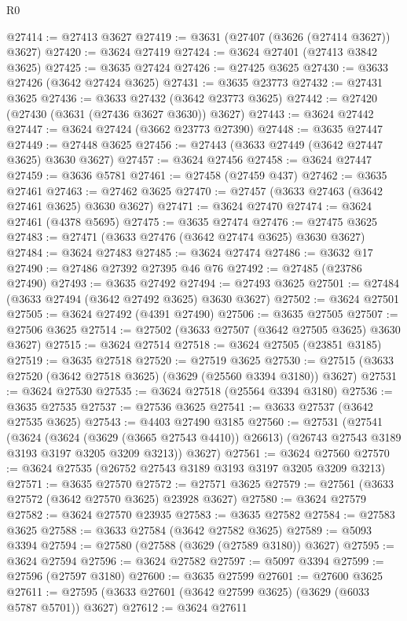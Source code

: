 \begin{lexlean}{R0}
\begin{coremodule}
@27414 := @27413 @3627
@27419 := @3631 (@27407 (@3626 (@27414 @3627)) @3627)
@27420 := @3624 @27419
@27424 := @3624 @27401 (@27413 @3842 @3625)
@27425 := @3635 @27424
@27426 := @27425 @3625
@27430 := @3633 @27426 (@3642 @27424 @3625)
@27431 := @3635 @23773
@27432 := @27431 @3625
@27436 := @3633 @27432 (@3642 @23773 @3625)
@27442 := @27420 (@27430 (@3631 (@27436 @3627 @3630)) @3627)
@27443 := @3624 @27442
@27447 := @3624 @27424 (@3662 @23773 @27390)
@27448 := @3635 @27447
@27449 := @27448 @3625
@27456 := @27443 (@3633 @27449 (@3642 @27447 @3625) @3630 @3627)
@27457 := @3624 @27456
@27458 := @3624 @27447
@27459 := @3636 @5781
@27461 := @27458 (@27459 @437)
@27462 := @3635 @27461
@27463 := @27462 @3625
@27470 := @27457 (@3633 @27463 (@3642 @27461 @3625) @3630 @3627)
@27471 := @3624 @27470
@27474 := @3624 @27461 (@4378 @5695)
@27475 := @3635 @27474
@27476 := @27475 @3625
@27483 := @27471 (@3633 @27476 (@3642 @27474 @3625) @3630 @3627)
@27484 := @3624 @27483
@27485 := @3624 @27474
@27486 := @3632 @17
@27490 := @27486 @27392 @27395 @46 @76
@27492 := @27485 (@23786 @27490)
@27493 := @3635 @27492
@27494 := @27493 @3625
@27501 := @27484 (@3633 @27494 (@3642 @27492 @3625) @3630 @3627)
@27502 := @3624 @27501
@27505 := @3624 @27492 (@4391 @27490)
@27506 := @3635 @27505
@27507 := @27506 @3625
@27514 := @27502 (@3633 @27507 (@3642 @27505 @3625) @3630 @3627)
@27515 := @3624 @27514
@27518 := @3624 @27505 (@23851 @3185)
@27519 := @3635 @27518
@27520 := @27519 @3625
@27530 := @27515 (@3633 @27520 (@3642 @27518 @3625) (@3629 (@25560 @3394 @3180)) @3627)
@27531 := @3624 @27530
@27535 := @3624 @27518 (@25564 @3394 @3180)
@27536 := @3635 @27535
@27537 := @27536 @3625
@27541 := @3633 @27537 (@3642 @27535 @3625)
@27543 := @4403 @27490 @3185
@27560 := @27531
    (@27541
      (@3624
        (@3624 (@3629 (@3665 @27543 @4410)) @26613)
        (@26743 @27543 @3189 @3193 @3197 @3205 @3209 @3213))
      @3627)
@27561 := @3624 @27560
@27570 := @3624 @27535 (@26752 @27543 @3189 @3193 @3197 @3205 @3209 @3213)
@27571 := @3635 @27570
@27572 := @27571 @3625
@27579 := @27561 (@3633 @27572 (@3642 @27570 @3625) @23928 @3627)
@27580 := @3624 @27579
@27582 := @3624 @27570 @23935
@27583 := @3635 @27582
@27584 := @27583 @3625
@27588 := @3633 @27584 (@3642 @27582 @3625)
@27589 := @5093 @3394
@27594 := @27580 (@27588 (@3629 (@27589 @3180)) @3627)
@27595 := @3624 @27594
@27596 := @3624 @27582
@27597 := @5097 @3394
@27599 := @27596 (@27597 @3180)
@27600 := @3635 @27599
@27601 := @27600 @3625
@27611 := @27595 (@3633 @27601 (@3642 @27599 @3625) (@3629 (@6033 @5787 @5701)) @3627)
@27612 := @3624 @27611

\end{coremodule}
\end{lexlean}
